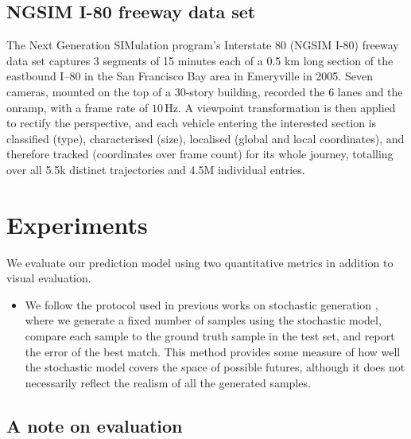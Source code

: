 \documentclass{article}
\begin{document}
\subsection{NGSIM I-80 freeway data set}
The Next Generation SIMulation program's Interstate 80 (NGSIM I-80) freeway data set \cite{halkias2006ngsim} captures 3 segments of 15 minutes each of a 0.5 km long section of the eastbound I–80 in the San Francisco Bay area in Emeryville in 2005.
Seven cameras, mounted on the top of a 30-story building, recorded the 6 lanes and the onramp, with a frame rate of $10\,\text{Hz}$.
A viewpoint transformation is then applied to rectify the perspective, and each vehicle entering the interested section is classified (type), characterised (size), localised (global and local coordinates), and therefore tracked (coordinates over frame count) for its whole journey, totalling over all 5.5k distinct trajectories and 4.5M individual entries.




\section{Experiments}


We evaluate our prediction model using two quantitative metrics in addition to visual evaluation.
\begin{itemize}
\item We follow the protocol used in previous works on stochastic generation \citep{Walker2016, Babaeizadeh2018, Denton2018}, where we generate a fixed number of samples using the stochastic model, compare each sample to the ground truth sample in the test set, and report the error of the best match.
  This method provides some measure of how well the stochastic model covers the space of possible futures, although it does not necessarily reflect the realism of all the generated samples.
\end{itemize}


\subsection{A note on evaluation}
\end{document}
